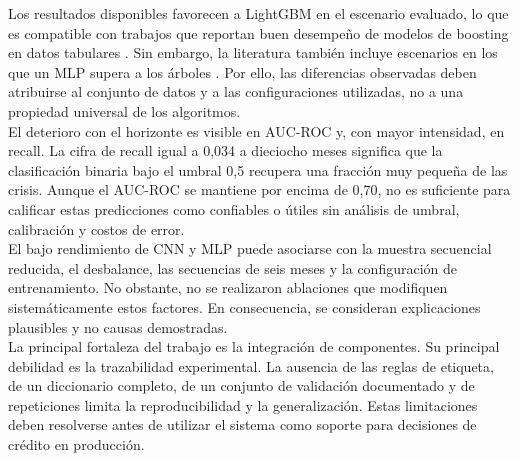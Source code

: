 Los resultados disponibles favorecen a LightGBM en el escenario evaluado, lo que es compatible con trabajos que reportan buen desempeño de modelos de boosting en datos tabulares \cite{lessmann2015benchmarking, moscato2021benchmark}. Sin embargo, la literatura también incluye escenarios en los que un MLP supera a los árboles \cite{gunnarsson2021deep}. Por ello, las diferencias observadas deben atribuirse al conjunto de datos y a las configuraciones utilizadas, no a una propiedad universal de los algoritmos.\\

El deterioro con el horizonte es visible en AUC-ROC y, con mayor intensidad, en recall. La cifra de recall igual a 0,034 a dieciocho meses significa que la clasificación binaria bajo el umbral 0,5 recupera una fracción muy pequeña de las crisis. Aunque el AUC-ROC se mantiene por encima de 0,70, no es suficiente para calificar estas predicciones como confiables o útiles sin análisis de umbral, calibración y costos de error.\\

El bajo rendimiento de CNN y MLP puede asociarse con la muestra secuencial reducida, el desbalance, las secuencias de seis meses y la configuración de entrenamiento. No obstante, no se realizaron ablaciones que modifiquen sistemáticamente estos factores. En consecuencia, se consideran explicaciones plausibles y no causas demostradas.\\

La principal fortaleza del trabajo es la integración de componentes. Su principal debilidad es la trazabilidad experimental. La ausencia de las reglas de etiqueta, de un diccionario completo, de un conjunto de validación documentado y de repeticiones limita la reproducibilidad y la generalización. Estas limitaciones deben resolverse antes de utilizar el sistema como soporte para decisiones de crédito en producción.